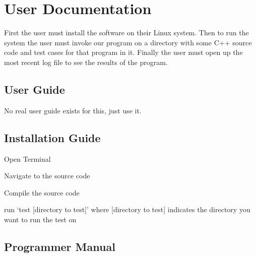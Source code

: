 
\chapter{User Documentation}

First the user must install the software on their Linux system.   Then to run the system 
the user must invoke our program on a directory with some C++ source code and test 
cases for that program in it.   Finally the user must open up the most recent log file to see 
the results of the program.


\section{User Guide}

No real user guide exists for this, just use it.  


\section{Installation Guide}
Open Terminal

Navigate to the source code

Compile the source code

run `test [directory to test]' where [directory to test] indicates the directory you want to run the 
test on


\section{Programmer Manual}

